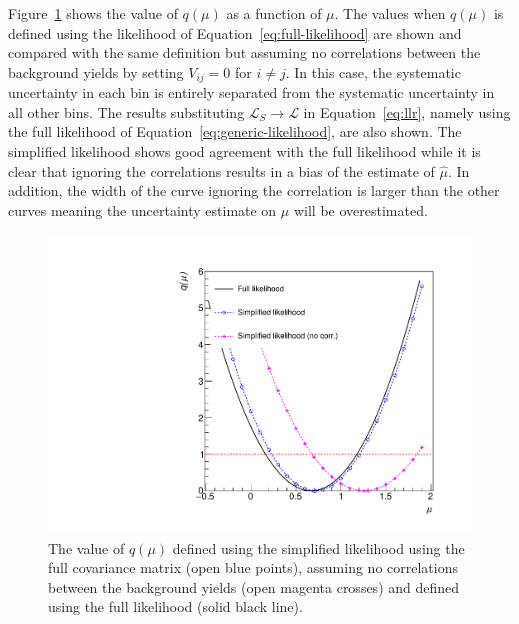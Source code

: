 Figure~\ref{fig:likelihoodscan} shows the value of $q(\mu)$ as a function of $\mu$. The values when $q(\mu)$ 
is defined using the likelihood of Equation~\ref{eq:full-likelihood} are shown and compared with the same definition but assuming no correlations between the 
background yields by setting $V_{ij}=0$ for $i\neq j$. In this case, the systematic uncertainty in each bin is entirely separated
from the systematic uncertainty in all other bins. The results substituting $\mathcal{L}_{S}\rightarrow\mathcal{L}$ in Equation~\ref{eq:llr}, 
namely using the full likelihood of Equation~\ref{eq:generic-likelihood}, are also shown. The simplified 
likelihood shows good agreement with the full likelihood while it is clear that ignoring the correlations results in a bias of the estimate of $\hat{\mu}$. In 
addition, the width of the curve ignoring the correlation is larger than the other curves meaning the uncertainty estimate on $\mu$ will be overestimated.  


\begin{figure}[hbt]
  \begin{center} 
   \includegraphics[width=1.5\cmsFigWidth]{figures/r.pdf}
   \caption{The value of $q(\mu)$ defined using the simplified likelihood using the full covariance matrix (open blue points), assuming no correlations between the 
   background yields (open magenta crosses) and defined using the full likelihood (solid black line).}
   \label{fig:likelihoodscan} 
  \end{center}
\end{figure}


